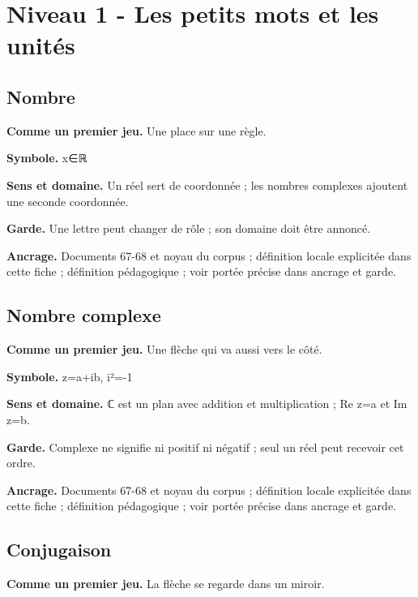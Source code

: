 \documentclass[
  9pt,
  a4paper,
]{article}
\begin{document}
\hypertarget{niveau-1---les-petits-mots-et-les-unituxe9s}{%
\section{Niveau 1 - Les petits mots et les
unités}\label{niveau-1---les-petits-mots-et-les-unituxe9s}}

\hypertarget{nombre}{%
\subsection{Nombre}\label{nombre}}

\textbf{Comme un premier jeu.} Une place sur une règle.

\textbf{Symbole.} x∈ℝ

\textbf{Sens et domaine.} Un réel sert de coordonnée ; les nombres
complexes ajoutent une seconde coordonnée.

\textbf{Garde.} Une lettre peut changer de rôle ; son domaine doit être
annoncé.

\textbf{Ancrage.} Documents 67-68 et noyau du corpus ; définition locale
explicitée dans cette fiche ; définition pédagogique ; voir portée
précise dans ancrage et garde.

\hypertarget{nombre-complexe}{%
\subsection{Nombre complexe}\label{nombre-complexe}}

\textbf{Comme un premier jeu.} Une flèche qui va aussi vers le côté.

\textbf{Symbole.} z=a+ib, i²=-1

\textbf{Sens et domaine.} ℂ est un plan avec addition et multiplication
; Re z=a et Im z=b.

\textbf{Garde.} Complexe ne signifie ni positif ni négatif ; seul un
réel peut recevoir cet ordre.

\textbf{Ancrage.} Documents 67-68 et noyau du corpus ; définition locale
explicitée dans cette fiche ; définition pédagogique ; voir portée
précise dans ancrage et garde.

\hypertarget{conjugaison}{%
\subsection{Conjugaison}\label{conjugaison}}

\textbf{Comme un premier jeu.} La flèche se regarde dans un miroir.
\end{document}
